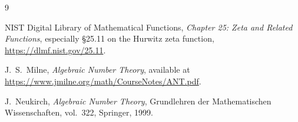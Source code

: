 \documentclass[11pt]{amsart}
\numberwithin{equation}{section}
\theoremstyle{definition}
\begin{document}
\begin{thebibliography}{9}

NIST Digital Library of Mathematical Functions,
\emph{Chapter 25: Zeta and Related Functions}, especially \S25.11 on the Hurwitz zeta function,
\url{https://dlmf.nist.gov/25.11}.

J.~S.~Milne,
\emph{Algebraic Number Theory}, available at
\url{https://www.jmilne.org/math/CourseNotes/ANT.pdf}.

J.~Neukirch,
\emph{Algebraic Number Theory},
Grundlehren der Mathematischen Wissenschaften, vol.~322,
Springer, 1999.

\end{thebibliography}
\end{document}
